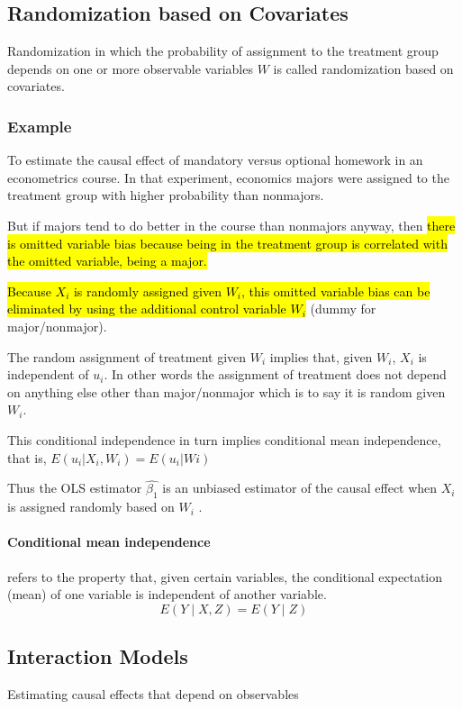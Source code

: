 \documentclass[a3paper, 8pt]{extarticle}
\begin{document}
\begin{multicols*}{5}
\subsection{Randomization based on Covariates}
 Randomization in which the probability of assignment to the treatment group depends on one or more observable variables $W$ is called randomization based on covariates.

 \subsubsection{Example}

 To estimate the causal effect of mandatory versus optional homework in an econometrics course. In that experiment, economics majors were assigned to the treatment group with higher probability than nonmajors. 
 
 But if majors tend to do better in the course than nonmajors anyway, then \hl{there is omitted variable bias because being in the treatment group is correlated with the omitted variable, being a major.}

 \hl{Because $X_i$ is randomly assigned given $W_i$,
 this omitted variable bias can be eliminated by using the additional control variable $W_i$} (dummy for major/nonmajor).
 
 The random assignment of treatment given $W_i$ implies that, given $W_i$, $X_i$ is independent of $u_i$. In other words the assignment of treatment does not depend on anything else other than major/nonmajor which is to say it is random given $W_i$.
 
 This conditional independence in turn implies conditional mean independence, that is, $E(u_i | X_i,W_i) = E(u_i| Wi)$ 
 
 Thus the OLS estimator $\hat{\beta_1}$ is an unbiased estimator of the causal effect when $X_i$ is assigned randomly based on $W_i$ .

\paragraph{Conditional mean independence} refers to the property that, given certain variables, the conditional expectation (mean) of one variable is independent of another variable. $$E(Y∣X,Z)=E(Y∣Z)$$
\subsection{Interaction Models}
Estimating causal effects that depend on observables


\end{multicols*}
\end{document}
